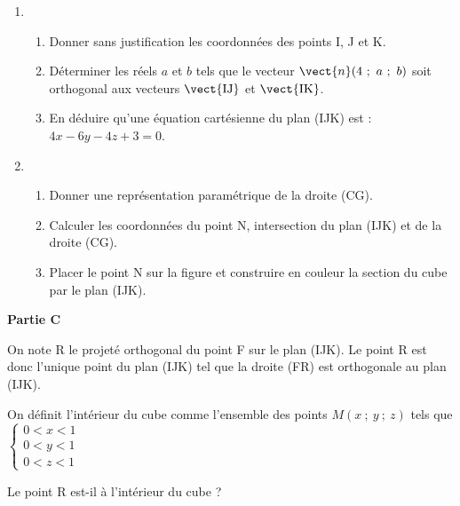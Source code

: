 \documentclass{cornouaille}
\begin{document}
\begin{exercice}
\medskip

\begin{enumerate}
\item 
	\begin{enumerate}
		\item Donner sans justification les coordonnées des points I, J et K.
		\item Déterminer les réels $a$ et $b$ tels que le vecteur $\vect{n} (4~;~a~;~b)$ soit orthogonal aux vecteurs $\vect{\text{IJ}}$ et $\vect{\text{IK}}$.
		\item  En déduire qu'une équation cartésienne du plan (IJK) est : $4x - 6y - 4z + 3 = 0$.
	\end{enumerate}
\item 
	\begin{enumerate}
		\item Donner une représentation paramétrique de la droite (CG).
		\item Calculer les coordonnées du point N, intersection du plan (IJK) et de la droite (CG).
		\item Placer le point N sur la figure et construire en couleur la section du cube par le plan (IJK).
	\end{enumerate}
\end{enumerate}

\bigskip

\textbf{Partie C}

\medskip

On note R le projeté orthogonal du point F sur le plan (IJK). Le point R est donc l'unique point du
plan (IJK) tel que la droite (FR) est orthogonale au plan (IJK).


On définit l'intérieur du cube comme l'ensemble des points $M(x~;~y~;~z)$ tels que $\left\{\begin{array}{l}
0 < x < 1\\
0 < y < 1\\
0 < z < 1
\end{array}\right.$

Le point R est-il à l'intérieur du cube ?
\end{exercice}
\end{document}
